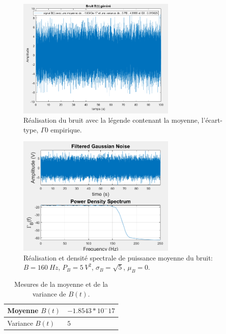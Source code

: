 \documentclass{article}
\begin{document}
\begin{figure}
\centerline{\includegraphics[width=0.7\textwidth]{images/bruitgenere.png}}
\caption{Réalisation du bruit avec la légende contenant la moyenne, l'écart-type, $\Gamma0$ empirique.}
\label{fig-B}
\end{figure}

\begin{figure}
\centerline{\includegraphics[width=0.7\textwidth]{images/bruitgen_G.png}}
\caption{Réalisation et densité spectrale de puissance moyenne  du bruit: $B=160~Hz$, $P_B= 5~V^2$, $\sigma_B = \sqrt{5}$, $\mu_B=0$.}
\label{fig-B}
\end{figure}
\newpage

\begin{table}[h]
\begin{center}
\begin{tabular}{| L{40mm} | C{40mm}|}\hline
Moyenne $B(t)$ 	& {$-1.8543 * 10^-17$}  	\\[5mm] \hline
Variance $B(t)$ & {$5$}   	\\[5mm] \hline
\end{tabular}
\end{center}
\label{table-B}
\caption{Mesures de la moyenne et de la variance de $B(t)$.}
\label{tab-B}
\end{table}
\end{document}
